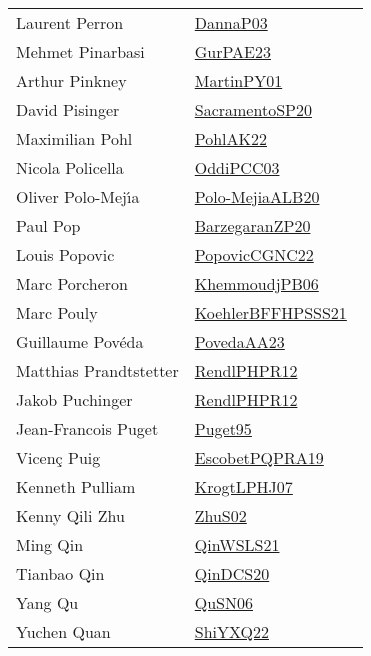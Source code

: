 {\begin{longtable}{p{4cm}p{20cm}}
Laurent Perron & \href{papers/DannaP03.pdf}{DannaP03}~\cite{DannaP03}\\
Mehmet Pinarbasi & \href{articles/GurPAE23.pdf}{GurPAE23}~\cite{GurPAE23}\\
Arthur Pinkney & \href{articles/MartinPY01.pdf}{MartinPY01}~\cite{MartinPY01}\\
David Pisinger & \href{articles/SacramentoSP20.pdf}{SacramentoSP20}~\cite{SacramentoSP20}\\
Maximilian Pohl & \href{articles/PohlAK22.pdf}{PohlAK22}~\cite{PohlAK22}\\
Nicola Policella & \href{papers/OddiPCC03.pdf}{OddiPCC03}~\cite{OddiPCC03}\\
Oliver Polo{-}Mej{\'{\i}}a & \href{}{Polo-MejiaALB20}~\cite{Polo-MejiaALB20}\\
Paul Pop & \href{papers/BarzegaranZP20.pdf}{BarzegaranZP20}~\cite{BarzegaranZP20}\\
Louis Popovic & \href{papers/PopovicCGNC22.pdf}{PopovicCGNC22}~\cite{PopovicCGNC22}\\
Marc Porcheron & \href{papers/KhemmoudjPB06.pdf}{KhemmoudjPB06}~\cite{KhemmoudjPB06}\\
Marc Pouly & \href{articles/KoehlerBFFHPSSS21.pdf}{KoehlerBFFHPSSS21}~\cite{KoehlerBFFHPSSS21}\\
Guillaume Pov{\'{e}}da & \href{papers/PovedaAA23.pdf}{PovedaAA23}~\cite{PovedaAA23}\\
Matthias Prandtstetter & \href{papers/RendlPHPR12.pdf}{RendlPHPR12}~\cite{RendlPHPR12}\\
Jakob Puchinger & \href{papers/RendlPHPR12.pdf}{RendlPHPR12}~\cite{RendlPHPR12}\\
Jean{-}Francois Puget & \href{papers/Puget95.pdf}{Puget95}~\cite{Puget95}\\
Vicen{\c{c}} Puig & \href{articles/EscobetPQPRA19.pdf}{EscobetPQPRA19}~\cite{EscobetPQPRA19}\\
Kenneth Pulliam & \href{papers/KrogtLPHJ07.pdf}{KrogtLPHJ07}~\cite{KrogtLPHJ07}\\
Kenny Qili Zhu & \href{papers/ZhuS02.pdf}{ZhuS02}~\cite{ZhuS02}\\
Ming Qin & \href{articles/QinWSLS21.pdf}{QinWSLS21}~\cite{QinWSLS21}\\
Tianbao Qin & \href{articles/QinDCS20.pdf}{QinDCS20}~\cite{QinDCS20}\\
Yang Qu & \href{papers/QuSN06.pdf}{QuSN06}~\cite{QuSN06}\\
Yuchen Quan & \href{}{ShiYXQ22}~\cite{ShiYXQ22}\\

\end{longtable}}
